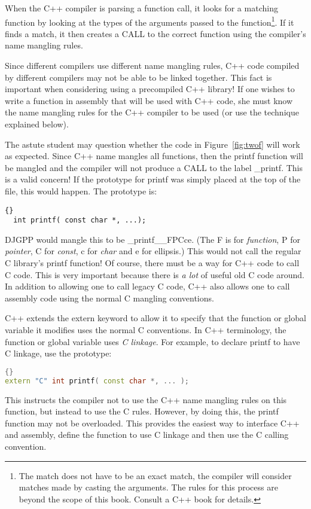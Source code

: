 When the C++ compiler is parsing a function call, it looks for a
matching function by looking at the types of the arguments passed to the
function\footnote{The match does not have to be an exact match, the compiler
will consider matches made by casting the arguments. The rules for this
process are beyond the scope of this book. Consult a C++ book for details.}.
If it finds a match, it then creates a {\code CALL} to the correct function
using the compiler's name mangling rules.

Since different compilers use different name mangling rules, C++ code
compiled by different compilers may not be able to be linked
together. This fact is important when considering using a precompiled
C++ library! If one wishes to write a function in assembly that will
be used with C++ code, she must know the name mangling rules for the
C++ compiler to be used (or use the technique explained below).

The astute student may question whether the code in Figure~\ref{fig:twof}
will work as expected. Since C++ name mangles all functions, then the
{\code printf} function will be mangled and the compiler will not produce
a {\code CALL} to the label {\code \_printf}. This is a valid concern!
If the prototype for {\code printf} was simply placed at the top of the file,
this would happen. The prototype is:
\begin{lstlisting}[stepnumber=0]{}
  int printf( const char *, ...);
\end{lstlisting}
\noindent DJGPP would mangle this to be {\code
\_printf\_\_FPCce}. (The {\code F} is for \emph{function}, {\code P}
for \emph{pointer}, {\code C} for \emph{const}, {\code c} for
\emph{char} and {\code e} for ellipsis.) This would not call the
regular C library's {\code printf} function! Of course, there must be
a way for C++ code to call C code. This is very important because
there is \emph{a lot} of useful old C code around.  In addition to
allowing one to call legacy C code, C++ also allows one to call
assembly code using the normal C mangling conventions.

C++ extends the {\code extern} keyword to allow it to specify that the
function or global variable it modifies uses the normal C conventions.
In C++ terminology, the function or global variable uses \emph{C
linkage}. For example, to declare {\code printf} to have C linkage,
use the prototype:
\begin{lstlisting}[language=C++,stepnumber=0]{}
extern "C" int printf( const char *, ... );
\end{lstlisting}
\noindent This instructs the compiler not to use the C++ name mangling
rules on this function, but instead to use the C rules. However, by
doing this, the {\code printf} function may not be overloaded. This provides
the easiest way to interface C++ and assembly, define the function to
use C linkage and then use the C calling convention.

